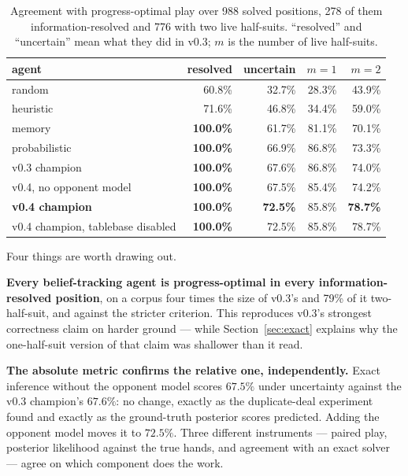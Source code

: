 \documentclass[11pt,a4paper]{article}
\begin{document}
\begin{table}[t]
\centering
\small
\begin{tabular}{lrrrr}
\toprule
agent & resolved & uncertain & $m{=}1$ & $m{=}2$ \\
\midrule
random             & 60.8\% & 32.7\% & 28.3\% & 43.9\% \\
heuristic          & 71.6\% & 46.8\% & 34.4\% & 59.0\% \\
memory             & \textbf{100.0\%} & 61.7\% & 81.1\% & 70.1\% \\
probabilistic      & \textbf{100.0\%} & 66.9\% & 86.8\% & 73.3\% \\
v0.3 champion      & \textbf{100.0\%} & 67.6\% & 86.8\% & 74.0\% \\
v0.4, no opponent model & \textbf{100.0\%} & 67.5\% & 85.4\% & 74.2\% \\
\textbf{v0.4 champion}  & \textbf{100.0\%} & \textbf{72.5\%} & 85.8\% & \textbf{78.7\%} \\
v0.4 champion, tablebase disabled & \textbf{100.0\%} & 72.5\% & 85.8\% & 78.7\% \\
\bottomrule
\end{tabular}
\caption{Agreement with progress-optimal play over 988 solved positions, 278 of
them information-resolved and 776 with two live half-suits. ``resolved'' and
``uncertain'' mean what they did in v0.3; $m$ is the number of live half-suits.}
\label{tab:exact}
\end{table}

Four things are worth drawing out.

\textbf{Every belief-tracking agent is progress-optimal in every
information-resolved position}, on a corpus four times the size of v0.3's and
79\% of it two-half-suit, and against the stricter criterion. This reproduces
v0.3's strongest correctness claim on harder ground --- while
Section~\ref{sec:exact} explains why the one-half-suit version of that claim was
shallower than it read.

\textbf{The absolute metric confirms the relative one, independently.} Exact
inference without the opponent model scores $67.5\%$ under uncertainty against
the v0.3 champion's $67.6\%$: no change, exactly as the duplicate-deal
experiment found and exactly as the ground-truth posterior scores predicted.
Adding the opponent model moves it to $72.5\%$. Three different instruments ---
paired play, posterior likelihood against the true hands, and agreement with an
exact solver --- agree on which component does the work.
\end{document}
